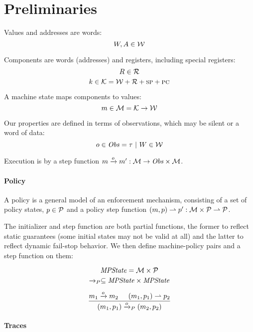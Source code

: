 \documentclass[conference]{IEEEtran}
\begin{document}
  \section{Preliminaries}

  
    Values and addresses are words:
    \[W,A \in {\mathcal W}\]
    
    Components are words (addresses) and registers, including special registers:
    \[R \in {\mathcal R}\]
    \[k \in {\mathcal K} = {\mathcal W} + {\mathcal R} + \textsc{sp} + \textsc{pc}\]

    A machine state maps components to values:
    \[m \in {\mathcal M} = {\mathcal K} \rightarrow {\mathcal W}\]

    Our properties are defined in terms of observations, which may be silent or a word of data:
    \[o \in \mathit{Obs} = \tau ~ | ~ W \in {\mathcal W}\]
    
    Execution is by a step function \(m \xrightarrow{o} m' : {\mathcal M} \rightarrow
    \mathit{Obs} \times {\mathcal M}\).

    \paragraph*{Policy}
    
    A policy is a general model of an enforcement mechanism,
    consisting of a set of policy states, \(p \in \mathcal{P}\) and a
    policy step function \((m, p) \rightharpoonup p' : {\mathcal M}
    \times \mathcal{P} \rightharpoonup \mathcal{P}\).

    The initializer and step function are both partial functions,
    the former to reflect static guarantees (some initial states may not be valid at all) and
    the latter to reflect dynamic fail-stop behavior. We then define machine-policy pairs and
    a step function on them:

    \[\mathit{MPState} = {\mathcal M} \times \mathcal{P}\]
    \[\xrightarrow{}_P \subseteq \mathit{MPState} \times \mathit{MPState}\]

    \[\frac{m_1 \xrightarrow{o} m_2 \hspace{.5cm} (m_1, p_1) \rightharpoonup p_2}
           {(m_1,p_1) \xrightarrow{o}_P (m_2,p_2)}\]

  \paragraph{Traces}
\end{document}
